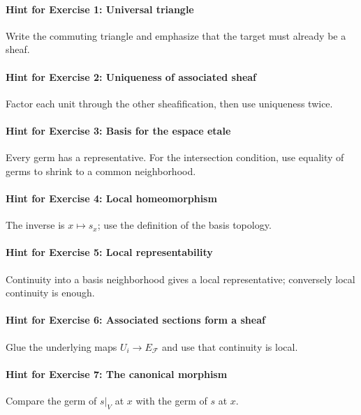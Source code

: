 \paragraph{Hint for Exercise 1: Universal triangle}\mbox{}\par
Write the commuting triangle and emphasize that the target must already be a sheaf.


\paragraph{Hint for Exercise 2: Uniqueness of associated sheaf}\mbox{}\par
Factor each unit through the other sheafification, then use uniqueness twice.


\paragraph{Hint for Exercise 3: Basis for the espace etale}\mbox{}\par
Every germ has a representative.  For the intersection condition, use equality of germs to shrink to a common neighborhood.


\paragraph{Hint for Exercise 4: Local homeomorphism}\mbox{}\par
The inverse is $x\mapsto s_x$; use the definition of the basis topology.


\paragraph{Hint for Exercise 5: Local representability}\mbox{}\par
Continuity into a basis neighborhood gives a local representative; conversely local continuity is enough.


\paragraph{Hint for Exercise 6: Associated sections form a sheaf}\mbox{}\par
Glue the underlying maps $U_i\to E_{\mathcal F}$ and use that continuity is local.


\paragraph{Hint for Exercise 7: The canonical morphism}\mbox{}\par
Compare the germ of $s|_V$ at $x$ with the germ of $s$ at $x$.


